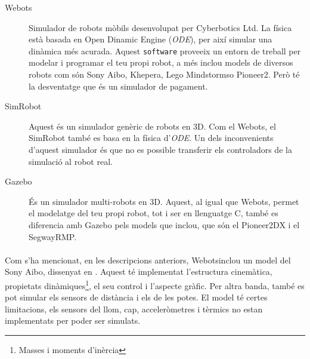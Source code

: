 \documentclass[12pt,a4paper,final,twoside]{article}
\begin{document}
\begin{description}
\item[Webots\texttrademark] \cite{Michel2004} Simulador de robots mòbils desenvolupat per Cyberbotics Ltd. La física està basada en Open Dinamic Engine (\textit{ODE}), per així simular una dinàmica més acurada. Aquest \texttt{software} proveeix un entorn de treball per modelar i programar el teu propi robot, a més inclou models de diversos robots com són Sony Aibo, Khepera, Lego Mindstorms\texttrademark o Pioneer2. Però té la desventatge que és un simulador de pagament.

\item[SimRobot] \cite{Laue2006a} Aquest és un simulador genèric de robots en 3D. Com el Webots\texttrademark , el SimRobot també es basa en la física d'\textit{ODE}. Un dels inconvenients d'aquest simulador és que no es possible transferir els controladors de la simulació al robot real.

\item[Gazebo] \cite{Khatib2002} És un simulador multi-robots en 3D. Aquest, al igual que Webots\texttrademark , permet el modelatge del teu propi robot, tot i ser en llenguatge C, també es diferencia amb Gazebo pels models que inclou, que són el Pioneer2DX i el SegwayRMP.
\end{description}

\paragraph{}Com s'ha mencionat, en les descripcions anteriors, Webots\texttrademark inclou un model del Sony Aibo, dissenyat en \cite{Hohl2006}. Aquest té implementat l'estructura cinemàtica, propietats dinàmiques\footnote{Masses i moments d'inèrcia}, el seu control i l'aspecte gràfic. Per altra banda, també es pot simular els sensors de distància i els de les potes. El model té certes limitacions, els sensors del llom, cap, acceleròmetres i tèrmics no estan implementats per poder ser simulats. 



\end{document}
